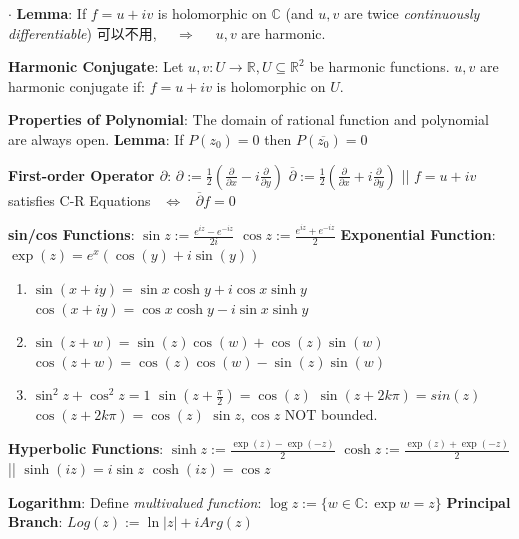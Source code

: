 \documentclass[9pt]{article}
\begin{document}
$\cdot$ \textbf{Lemma}: If $f=u+iv$ is holomorphic on $\mathbb{C}$ {\tiny (and $u,v$ are twice \textit{continuously differentiable}) 可以不用}, \ \ $\Rightarrow$ \ \ $u,v$ are harmonic.

\textbf{Harmonic Conjugate}: {\small Let $u,v:U\to\mathbb{R},U\subseteq\mathbb{R}^2 $ be harmonic functions. $u,v$ are harmonic conjugate if: $f=u+iv$ is holomorphic on $U$.}

\textbf{Properties of Polynomial}: {\small The domain of rational function and polynomial are always open.} \quad \quad \textbf{Lemma}: If $P(z_0)=0$ then $P(\overline{z_0})=0$

\textbf{First-order Operator $\partial$}: $\partial:=\frac{1}{2}\left(\frac{\partial}{\partial x}-i\frac{\partial}{\partial y}\right)$ \quad \quad $\overline{\partial}:=\frac{1}{2}\left(\frac{\partial}{\partial x}+i\frac{\partial}{\partial y}\right)$ \quad || \quad $f=u+iv$ satisfies C-R Equations \ $\Leftrightarrow$ \ $\overline{\partial}f=0$

\textbf{sin/cos Functions}: $\sin z:=\frac{e^{iz}-e^{-iz}}{2i}$ \quad \quad $\cos z:=\frac{e^{iz}+e^{-iz}}{2}$ \quad \quad \textbf{Exponential Function}: $\exp(z)=e^x(\cos(y)+i\sin(y))$

\begin{enumerate}[itemsep=-2pt, topsep=-2pt]
    \item $\sin(x+iy)=\sin x\cosh y+i\cos x\sinh y$ \quad $\cos(x+iy)=\cos x\cosh y-i\sin x\sinh y$
    \item $\sin(z+w)=\sin(z)\cos(w)+\cos(z)\sin(w)$ \quad $\cos(z+w)=\cos(z)\cos(w)-\sin(z)\sin(w)$ 
    \item $\sin^2z+\cos^2z=1$ \quad $\sin(z+\frac{\pi}{2})=\cos(z)$ \quad $\sin(z+2k\pi)=sin(z)$ \quad $\cos(z+2k\pi)=\cos(z)$ \quad \quad \star $\sin z,\cos z$ NOT bounded.
\end{enumerate}

\textbf{Hyperbolic Functions}: $\sinh z:=\frac{\exp(z)-\exp(-z)}{2}$ \quad \quad $\cosh z:=\frac{\exp(z)+\exp(-z)}{2}$ \quad \quad || \quad \quad $\sinh(iz)=i\sin z$ \quad $\cosh(iz)=\cos z$

\textbf{Logarithm}: Define \textit{multivalued function}: $\log{z}:=\{w\in\mathbb{C}:\exp{w}=z\}$ \quad \quad \quad \textbf{Principal Branch}: $Log(z):=\ln|z|+iArg(z)$
\end{document}
